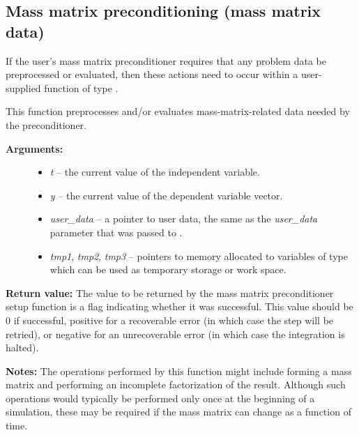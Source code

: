 \documentclass[letterpaper,10pt,english]{sphinxmanual}
\begin{document}
\subsection{Mass matrix preconditioning (mass matrix data)}
\label{c_interface/User_supplied:cinterface-masprecsetupfn}\label{c_interface/User_supplied:mass-matrix-preconditioning-mass-matrix-data}
If the user's mass matrix preconditioner requires that any problem
data be preprocessed or evaluated, then these actions need to occur
within a user-supplied function of type
{\hyperref[c_interface/User_supplied:c.ARKSpilsMassPrecSetupFn]{\emph{}}}.

\begin{fulllineitems}
\label{c_interface/User_supplied:c.ARKSpilsMassPrecSetupFn}
This function preprocesses and/or evaluates mass-matrix-related
data needed by the preconditioner.
\begin{description}
\item[{\textbf{Arguments:}}] \leavevmode\begin{itemize}
\item {} 
\emph{t} -- the current value of the independent variable.

\item {} 
\emph{y} -- the current value of the dependent variable vector.

\item {} 
\emph{user\_data} -- a pointer to user data, the same as the
\emph{user\_data} parameter that was passed to {\hyperref[c_interface/User_callable:c.ARKodeSetUserData]{\emph{}}}.

\item {} 
\emph{tmp1}, \emph{tmp2}, \emph{tmp3} -- pointers to memory allocated to
variables of type  which can be used as temporary
storage or work space.

\end{itemize}

\end{description}

\textbf{Return value:}
The value to be returned by the mass matrix preconditioner setup
function is a flag indicating whether it was successful. This value
should be 0 if successful, positive for a recoverable error (in
which case the step will be retried), or negative for an
unrecoverable error (in which case the integration is halted).

\textbf{Notes:}  The operations performed by this function might include
forming a mass matrix and performing an incomplete
factorization of the result.  Although such operations would
typically be performed only once at the beginning of a simulation,
these may be required if the mass matrix can change as a function
of time.

\end{fulllineitems}
\end{document}
